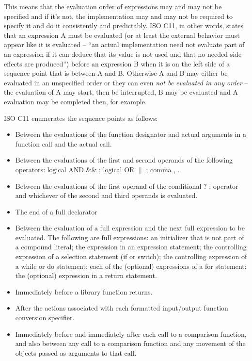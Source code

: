 This means that the evaluation order of expressions may and may not be specified and if it's not, the implementation may and may not be required to specify it and do it consistently and predictably. ISO C11, in other words, states that an expression A must be evaluated (or at least the external behavior must appear like it is evaluated -- ``an actual implementation need not evaluate part of an expression if it can deduce that its value is not used and that no needed side effects are produced''\cite{WG14N1570}) before an expression B when it is on the left side of a sequence point that is between A and B. Otherwise A and B may either be evaluated in an unspecified order or they can even \emph{not be evaluated in any order} -- the evaluation of A may start, then be interrupted, B may be evaluated and A evaluation may be completed then, for example.

ISO C11 enumerates the sequence points as follows:\cite{WG14N1570}
\begin{itemize}
    \item Between the evaluations of the function designator and actual arguments in a function call and the actual call.
    \item Between the evaluations of the first and second operands of the following operators: logical AND $\&\&$ ; logical OR $\|$ ; comma , .
    \item Between the evaluations of the first operand of the conditional ? : operator and whichever of the second and third operands is evaluated.
    \item The end of a full declarator
    \item Between the evaluation of a full expression and the next full expression to be evaluated. The following are full expressions: an initializer that is not part of a compound literal; the expression in an expression statement; the
controlling expression of a selection statement (if or switch); the controlling expression of a while or do statement; each of the (optional) expressions of a for statement; the (optional) expression in a return statement.
    \item Immediately before a library function returns.
    \item After the actions associated with each formatted input/output function conversion specifier.
    \item Immediately before and immediately after each call to a comparison function, and also between any call to a comparison function and any movement of the objects passed as arguments to that call.
\end{itemize}


